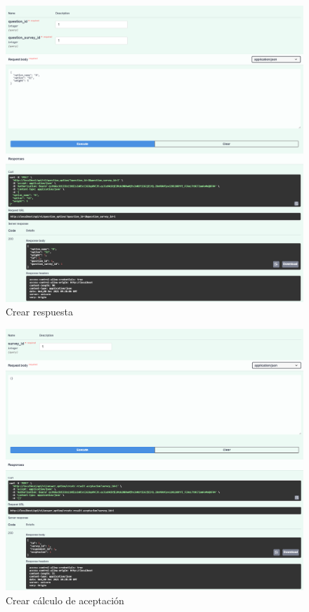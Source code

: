 \begin{figure}[!htb]
    \centering
    \includegraphics[scale=.3]{TT/img/pruebas/test_crear_opcion_de_respuesta.png}
    \caption{Crear respuesta}
    \label{graphic:crearrespuesta}
\end{figure}

\begin{figure}[!htb]
    \centering
    \includegraphics[scale=.3]{TT/img/pruebas/test_crear_aceptacion.png}
    \caption{Crear cálculo de aceptación}
    \label{graphic:crearaceptación}
\end{figure}

